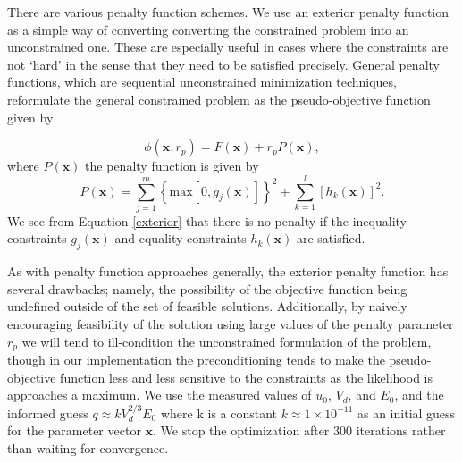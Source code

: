 \documentclass[12pt,a4paper,oneside]{book}
\begin{document}
There are various penalty function schemes. We use an exterior penalty function as a simple way of converting converting the constrained problem into an unconstrained one. These are especially useful in cases where the constraints are not `hard' in the sense that they need to be satisfied precisely. General penalty functions, which are sequential unconstrained minimization techniques, reformulate the general constrained problem as the pseudo-objective function given by

\[ \phi(\mathbf{x}, r_p ) = F(\mathbf{x}) + r_p P(\mathbf{x}), \]
where $P \left( \mathbf{x} \right)$ the penalty function is given by
\begin{equation} \label{exterior}
 P( \mathbf{x} ) = \sum_{j = 1}^m \left\lbrace \mbox{max} \left[ 0, g_j(\mathbf{x} ) \right] \right\rbrace^2 + 
\sum_{k = 1}^l \left[ h_k( \mathbf{x}) \right]^2 .
\end{equation}
We see from Equation \ref{exterior} that there is no penalty if the inequality constraints $g_j(\mathbf{x})$ and equality constraints $h_k(\mathbf{x})$ are satisfied.
 
As with penalty function approaches generally, the exterior penalty function has several drawbacks; namely, the possibility of the objective function being undefined outside of the set of feasible solutions. Additionally, by naively encouraging feasibility of the solution using large values of the penalty parameter $r_p$ we will tend to ill-condition the unconstrained formulation of the problem, though in our implementation the preconditioning tends to make the pseudo-objective function less and less sensitive to the constraints as the likelihood is approaches a maximum. We use the measured values of $u_0$, $V_d$, and $E_0$, and the informed guess $q \approx k V_d^{2/3} E_0$ where k is a constant $k \approx 1 \times 10^{-11}$ as an initial guess for the parameter vector $\mathbf{x}$. We stop the optimization after 300 iterations rather than waiting for convergence.
\end{document}
